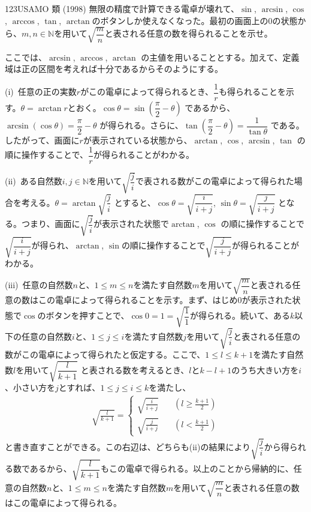 \begin{prob}{123}{}{USAMO 類 (1998)}
 無限の精度で計算できる電卓が壊れて、$\sin$, $\arcsin$, $\cos$, $\arccos$, $\tan$, $\arctan$のボタンしか使えなくなった。最初の画面上の0の状態から、$m, n\in\mathbb{N}$を用いて$\sqrt{\dfrac{m}{n}}$と表される任意の数を得られることを示せ。
\end{prob}
ここでは、$\arcsin$, $\arccos$, $\arctan$ の主値を用いることとする。加えて、定義域は正の区間を考えれば十分であるからそのようにする。

(i)~任意の正の実数$r$がこの電卓によって得られるとき、$\dfrac{1}{r}$も得られることを示す。$\theta=\arctan r$とおく。$\cos\theta=\sin\left(\dfrac{\pi}{2}-\theta\right)$ であるから、$\arcsin(\cos\theta)=\dfrac{\pi}{2}-\theta$ が得られる。さらに、$\tan\left(\dfrac{\pi}{2}-\theta\right)=\dfrac{1}{\tan\theta}$ である。したがって、画面に$r$が表示されている状態から、$\arctan$, $\cos$, $\arcsin$, $\tan$ の順に操作することで、$\dfrac{1}{r}$が得られることがわかる。

(ii)~ある自然数$i, j\in\mathbb{N}$を用いて$\sqrt{\dfrac{j}{i}}$で表される数がこの電卓によって得られた場合を考える。$\theta=\arctan \sqrt{\dfrac{j}{i}}$ とすると、$\cos\theta=\sqrt{\dfrac{i}{i+j}}$, $\sin\theta=\sqrt{\dfrac{j}{i+j}}$ となる。つまり、画面に$\sqrt{\dfrac{j}{i}}$が表示された状態で$\arctan$, $\cos$ の順に操作することで$\sqrt{\dfrac{i}{i+j}}$が得られ、$\arctan$, $\sin$の順に操作することで$\sqrt{\dfrac{j}{i+j}}$が得られることがわかる。

(iii)~任意の自然数$n$と、$1\le m \le n$を満たす自然数$m$を用いて$\sqrt{\dfrac{m}{n}}$と表される任意の数はこの電卓によって得られることを示す。まず、はじめ$0$が表示された状態で$\cos$のボタンを押すことで、$\cos 0 = 1 = \sqrt{\dfrac{1}{1}}$が得られる。続いて、ある$k$以下の任意の自然数$i$と、$1\le j \le i$を満たす自然数$j$を用いて$\sqrt{\dfrac{j}{i}}$と表される任意の数がこの電卓によって得られたと仮定する。ここで、$1\le l \le k+1$を満たす自然数$l$を用いて$\sqrt{\dfrac{l}{k+1}}$ と表される数を考えるとき、$l$と$k-l+1$のうち大きい方を$i$、小さい方を$j$とすれば、$1\le j \le i \le k$を満たし、
\begin{align*}
 \sqrt{\frac{l}{k+1}}=\left\{
 \begin{aligned}
  \sqrt{\frac{i}{i+j}} &\quad\left(l\ge \frac{k+1}{2}\right) \\
  \sqrt{\frac{j}{i+j}} &\quad\left(l < \frac{k+1}{2}\right)
 \end{aligned}\right.
\end{align*}
と書き直すことができる。この右辺は、どちらも(ii)の結果により$\sqrt{\dfrac{j}{i}}$から得られる数であるから、$\sqrt{\dfrac{l}{k+1}}$もこの電卓で得られる。以上のことから帰納的に、任意の自然数$n$と、$1\le m \le n$を満たす自然数$m$を用いて$\sqrt{\dfrac{m}{n}}$と表される任意の数はこの電卓によって得られる。

